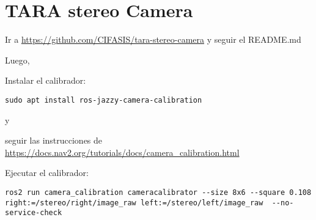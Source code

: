 \documentclass[apunte]{lcc}
\begin{document}
\maketitle

\section{TARA stereo Camera}

Ir a \url{https://github.com/CIFASIS/tara-stereo-camera} y seguir el README.md

Luego,

Instalar el calibrador:

\begin{lstlisting}[style=bash]
sudo apt install ros-jazzy-camera-calibration
\end{lstlisting}

y 

seguir las instrucciones de \url{https://docs.nav2.org/tutorials/docs/camera_calibration.html}


Ejecutar el calibrador:

\begin{lstlisting}[style=bash]
ros2 run camera_calibration cameracalibrator --size 8x6 --square 0.108 right:=/stereo/right/image_raw left:=/stereo/left/image_raw  --no-service-check
\end{lstlisting}
\end{document}
